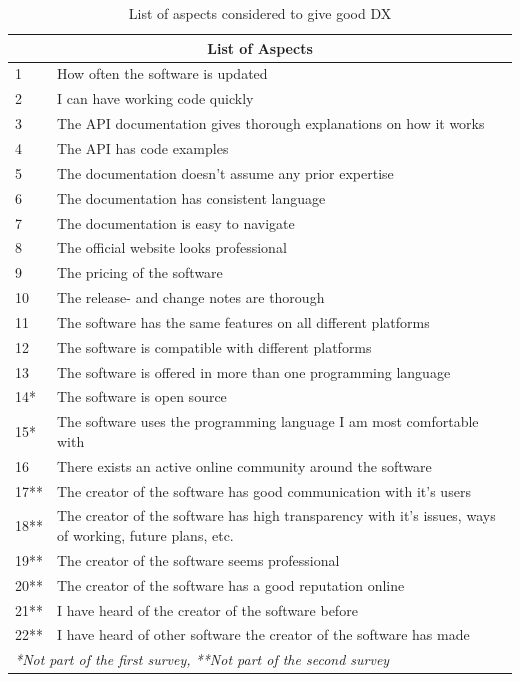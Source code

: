 \documentclass{cslthse-msc}
\begin{document}
    \begin{table}[H]
        \centering
        \begin{tabularx}{\columnwidth}{l X}
            \multicolumn{2}{c}{\textbf{List of Aspects}} \\
            \hline
            1    & How often the software is updated    \\
            2    & I can have working code quickly  \\
            3    & The API documentation gives thorough explanations on how it works    \\
            4    & The API has code examples    \\
            5    & The documentation doesn't assume any prior expertise \\
            6    & The documentation has consistent language    \\
            7    & The documentation is easy to navigate    \\
            8    & The official website looks professional  \\
            9    & The pricing of the software  \\
            10    &  The release- and change notes are thorough \\
            11   &  The software has the same features on all different platforms   \\
            12    &  The software is compatible with different platforms    \\
            13  &  The software is offered in more than one programming language    \\
            14*    &  The software is open source    \\
            15*    &  The software uses the programming language I am most comfortable with  \\
            16    &  There exists an active online community around the software    \\
            \hline \hline
            17** & The creator of the software has good communication with it's users \\
            18** & The creator of the software has high transparency with it's issues, ways of working, future plans, etc. \\
            19** & The creator of the software seems professional \\
            20** & The creator of the software has a good reputation online \\
            21** & I have heard of the creator of the software before \\
            22** & I have heard of other software the creator of the software has made\\ \hline \hline
            \multicolumn{2}{l}{\textit{*Not part of the first survey, **Not part of the second survey}}
        \end{tabularx}
        \caption{List of aspects considered to give good DX}
        \label{tab:aspects}
    \end{table}
\end{document}
